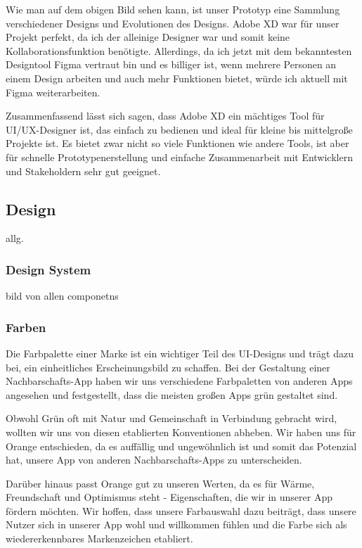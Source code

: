 Wie man auf dem obigen Bild sehen kann, ist unser Prototyp
eine Sammlung verschiedener Designs und Evolutionen des
Designs. Adobe XD war für unser Projekt perfekt, da ich der
alleinige Designer war und somit keine
Kollaborationsfunktion benötigte. Allerdings, da ich jetzt
mit dem bekanntesten Designtool Figma vertraut bin und es billiger ist, wenn mehrere
Personen an einem Design arbeiten und auch mehr Funktionen
bietet, würde ich aktuell mit Figma weiterarbeiten.

Zusammenfassend lässt sich sagen, dass Adobe XD ein mächtiges Tool für UI/UX-Designer ist, das einfach zu bedienen und ideal für kleine bis mittelgroße Projekte ist. Es bietet zwar nicht so viele Funktionen wie andere Tools, ist aber für schnelle Prototypenerstellung und einfache Zusammenarbeit mit Entwicklern und Stakeholdern sehr gut geeignet.

\subsection{Design}
allg.

\subsubsection{Design System}
bild von allen componetns

\subsubsection{Farben}
Die Farbpalette einer Marke ist ein wichtiger Teil des UI-Designs und trägt dazu bei, ein einheitliches Erscheinungsbild zu schaffen. Bei der Gestaltung einer Nachbarschafts-App haben wir uns verschiedene Farbpaletten von anderen Apps angesehen und festgestellt, dass die meisten großen Apps grün gestaltet sind.

Obwohl Grün oft mit Natur und Gemeinschaft in Verbindung gebracht wird, wollten wir uns von diesen etablierten Konventionen abheben. Wir haben uns für Orange entschieden, da es auffällig und ungewöhnlich ist und somit das Potenzial hat, unsere App von anderen Nachbarschafts-Apps zu unterscheiden.

Darüber hinaus passt Orange gut zu unseren Werten, da es für
Wärme, Freundschaft und Optimismus steht - Eigenschaften,
die wir in unserer App fördern möchten. Wir hoffen, dass
unsere Farbauswahl dazu beiträgt, dass unsere Nutzer sich in
unserer App wohl und willkommen fühlen und die Farbe sich
als wiedererkennbares Markenzeichen etabliert.



